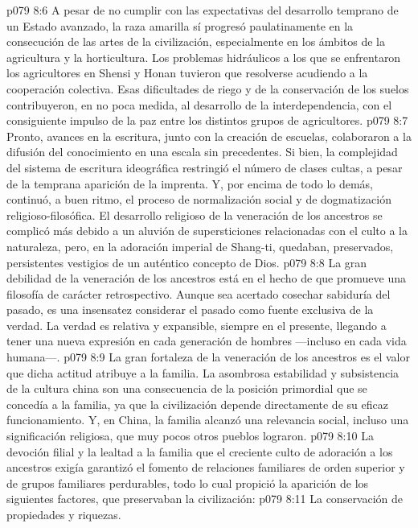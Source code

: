 \vs p079 8:6 A pesar de no cumplir con las expectativas del desarrollo temprano de un Estado avanzado, la raza amarilla sí progresó paulatinamente en la consecución de las artes de la civilización, especialmente en los ámbitos de la agricultura y la horticultura. Los problemas hidráulicos a los que se enfrentaron los agricultores en Shensi y Honan tuvieron que resolverse acudiendo a la cooperación colectiva. Esas dificultades de riego y de la conservación de los suelos contribuyeron, en no poca medida, al desarrollo de la interdependencia, con el consiguiente impulso de la paz entre los distintos grupos de agricultores.
\vs p079 8:7 Pronto, avances en la escritura, junto con la creación de escuelas, colaboraron a la difusión del conocimiento en una escala sin precedentes. Si bien, la complejidad del sistema de escritura ideográfica restringió el número de clases cultas, a pesar de la temprana aparición de la imprenta. Y, por encima de todo lo demás, continuó, a buen ritmo, el proceso de normalización social y de dogmatización religioso\hyp{}filosófica. El desarrollo religioso de la veneración de los ancestros se complicó más debido a un aluvión de supersticiones relacionadas con el culto a la naturaleza, pero, en la adoración imperial de Shang\hyp{}ti, quedaban, preservados, persistentes vestigios de un auténtico concepto de Dios.
\vs p079 8:8 La gran debilidad de la veneración de los ancestros está en el hecho de que promueve una filosofía de carácter retrospectivo. Aunque sea acertado cosechar sabiduría del pasado, es una insensatez considerar el pasado como fuente exclusiva de la verdad. La verdad es relativa y expansible, siempre  en el presente, llegando a tener una nueva expresión en cada generación de hombres ---incluso en cada vida humana---.
\vs p079 8:9 La gran fortaleza de la veneración de los ancestros es el valor que dicha actitud atribuye a la familia. La asombrosa estabilidad y subsistencia de la cultura china son una consecuencia de la posición primordial que se concedía a la familia, ya que la civilización depende directamente de su eficaz funcionamiento. Y, en China, la familia alcanzó una relevancia social, incluso una significación religiosa, que muy pocos otros pueblos lograron.
\vs p079 8:10 La devoción filial y la lealtad a la familia que el creciente culto de adoración a los ancestros exigía garantizó el fomento de relaciones familiares de orden superior y de grupos familiares perdurables, todo lo cual propició la aparición de los siguientes factores, que preservaban la civilización:
\vs p079 8:11 La conservación de propiedades y riquezas.
